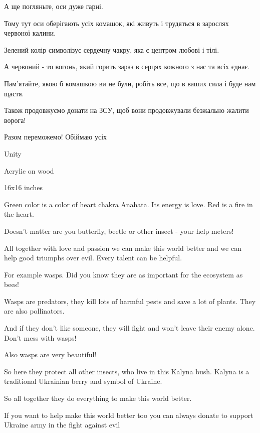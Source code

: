 А ще погляньте, оси дуже гарні.  

Тому тут оси оберігають усіх комашок, які живуть і трудяться в зарослях
червоної калини.

Зелений колір символізує сердечну чакру, яка є центром любові і тілі.

А червоний - то вогонь, який горить зараз в серцях кожного з нас та всіх єднає.

Пам'ятайте, якою б комашкою ви не були, робіть все, що в ваших сила і буде нам
щастя.

Також продовжуємо донати на ЗСУ, щоб вони продовжували безжально жалити ворога!

Разом переможемо! Обіймаю усіх💙💛

Unity

Acrylic on wood 

16x16 inches

Green color is a color of heart chakra Anahata. Its energy is love. Red is a
fire in the heart.

Doesn't matter are you butterfly, beetle or other insect - your help meters!

All together with love and passion we can make this world better and we can
help good triumphs over evil. Every talent can be helpful.

For example wasps. Did you know they are as important for the ecosystem as
bees!

Wasps are predators, they kill lots of harmful pests and save a lot of plants.
They are also pollinators.

And if they don't like someone, they will fight and won't leave their enemy
alone. Don't mess with wasps!

Also wasps are very beautiful!

So here they protect all other insects, who live in this Kalyna bush. Kalyna is
a traditional Ukrainian berry and symbol of Ukraine. 

So all together they do everything to make this world better. 

If you want to help make this world better too you can always donate to support
Ukraine army in the fight against evil💙💛

